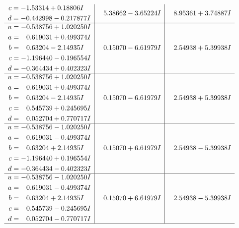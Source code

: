 \documentclass[1p]{elsarticle_modified}
\theoremstyle{definition}
\begin{document}
$$\begin{array}{c|c|c}
\begin{aligned}
c &= -1.53314 + 0.18806 I \\
d &= -0.442998 - 0.217877 I\end{aligned}
 & \phantom{-}5.38662 - 3.65224 I & \phantom{-}8.95361 + 3.74887 I \\ \hline\begin{aligned}
u &= -0.538756 + 1.020250 I \\
a &= \phantom{-}0.619031 + 0.499374 I \\
b &= \phantom{-}0.63204 - 2.14935 I \\
c &= -1.196440 - 0.196554 I \\
d &= -0.364434 + 0.402323 I\end{aligned}
 & \phantom{-}0.15070 - 6.61979 I & \phantom{-}2.54938 + 5.39938 I \\ \hline\begin{aligned}
u &= -0.538756 + 1.020250 I \\
a &= \phantom{-}0.619031 + 0.499374 I \\
b &= \phantom{-}0.63204 - 2.14935 I \\
c &= \phantom{-}0.545739 + 0.245695 I \\
d &= \phantom{-}0.052704 + 0.770717 I\end{aligned}
 & \phantom{-}0.15070 - 6.61979 I & \phantom{-}2.54938 + 5.39938 I \\ \hline\begin{aligned}
u &= -0.538756 - 1.020250 I \\
a &= \phantom{-}0.619031 - 0.499374 I \\
b &= \phantom{-}0.63204 + 2.14935 I \\
c &= -1.196440 + 0.196554 I \\
d &= -0.364434 - 0.402323 I\end{aligned}
 & \phantom{-}0.15070 + 6.61979 I & \phantom{-}2.54938 - 5.39938 I \\ \hline\begin{aligned}
u &= -0.538756 - 1.020250 I \\
a &= \phantom{-}0.619031 - 0.499374 I \\
b &= \phantom{-}0.63204 + 2.14935 I \\
c &= \phantom{-}0.545739 - 0.245695 I \\
d &= \phantom{-}0.052704 - 0.770717 I\end{aligned}
 & \phantom{-}0.15070 + 6.61979 I & \phantom{-}2.54938 - 5.39938 I\\
 \hline 
 \end{array}$$\newpage$$\begin{array}{c|c|c}  

\end{array}$$
\end{document}
